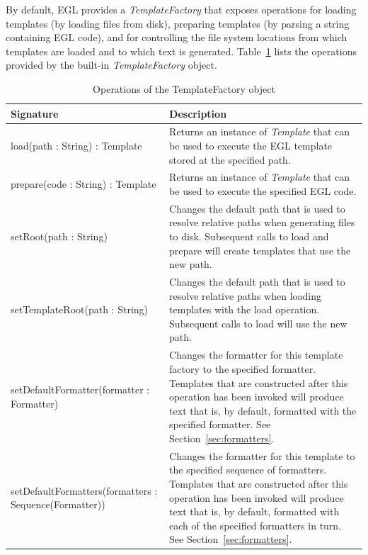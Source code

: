 By default, EGL provides a \emph{TemplateFactory} that exposes operations for loading templates (by loading files from disk), preparing templates (by parsing a string containing EGL code), and for controlling the file system locations from which templates are loaded and to which text is generated. Table~\ref{tab:TemplateFactoryOperations} lists the operations provided by the built-in \emph{TemplateFactory} object. 

\label{sec:template_factory}
\begin{longtable} {|p{5.5cm}|p{6.5cm}|}
			
			\caption{Operations of the TemplateFactory object}
			\label{tab:TemplateFactoryOperations}\\
			
			\hline
							
			\textbf{Signature} & \textbf{Description} \\\hline
			
			load(path : String) : Template & Returns an instance of \emph{Template} that can be used to execute the EGL template stored at the specified path.  \\\hline
			
			prepare(code : String) : Template & Returns an instance of \emph{Template} that can be used to execute the specified EGL code.  \\\hline
			
			setRoot(path : String) & Changes the default path that is used to resolve relative paths when generating files to disk. Subsequent calls to load and prepare will create templates that use the new path. \\\hline
			
			setTemplateRoot(path : String) & Changes the default path that is used to resolve relative paths when loading templates with the load operation. Subsequent calls to load will use the new path. \\\hline
			
			setDefaultFormatter(formatter : Formatter) & Changes the formatter for this template factory to the specified formatter. Templates that are constructed after this
operation has been invoked will produce text that is, by default, formatted with the specified formatter. See Section~\ref{sec:formatters}. \\\hline
			
			setDefaultFormatters(fo\-rm\-at\-te\-rs : Sequence(Formatter)) & Changes the formatter for this template to the specified sequence of formatters. Templates that are constructed after this operation has been invoked will produce text that is, by default, formatted with each of the specified formatters in turn. See Section~\ref{sec:formatters}.  \\\hline
\end{longtable}


